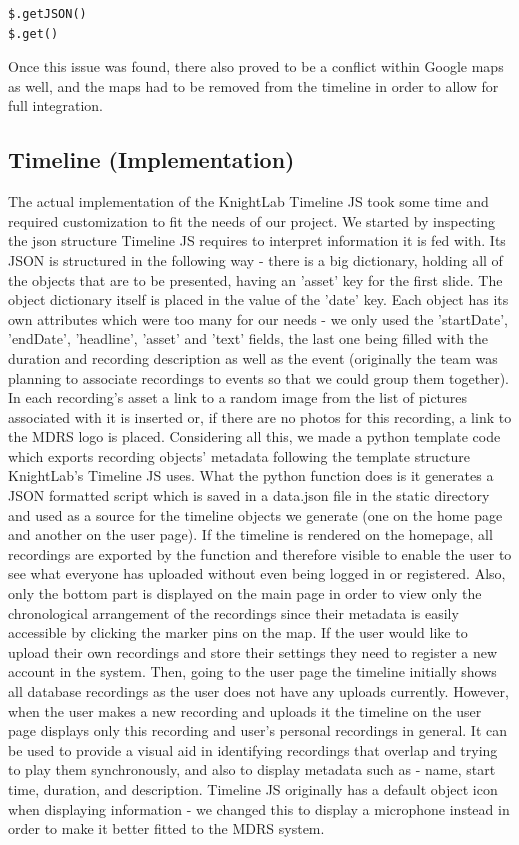 \documentclass{l3proj}
\begin{document}
\begin{verbatim}
$.getJSON()
$.get()
\end{verbatim}

Once this issue was found, there also proved to be a conflict within Google maps as well, and the maps had to be removed from the timeline in order to allow for full integration.

\subsection{Timeline (Implementation)}

The actual implementation of the KnightLab Timeline JS took some time and required customization to fit the needs of our project. We started by inspecting the json structure Timeline JS requires to interpret information it is fed with.
Its JSON is structured in the following way - there is a big dictionary, holding all of the objects that are to be presented, having an 'asset' key for the first slide.
The object dictionary itself is placed in the value of the 'date' key. Each object has its own attributes which were too many for our needs - we only used the 'startDate', 'endDate', 'headline', 'asset' and 'text' fields, the last one being filled with the duration and recording description as well as the event (originally the team was planning to associate recordings to events so that we could group them together).
In each recording's asset a link to a random image from the list of pictures associated with it is inserted or, if there are no photos for this recording, a link to the MDRS logo is placed.
Considering all this, we made a python template code which exports recording objects' metadata following the template structure KnightLab's Timeline JS uses.
What the python function does is it generates a JSON formatted script which is saved in a data.json file in the static directory and used as a source for the timeline objects we generate (one on the home page and another on the user page).
If the timeline is rendered on the homepage, all recordings are exported by the function and therefore visible to enable the user to see what everyone has uploaded without even being logged in or registered.
Also, only the bottom part is displayed on the main page in order to view only the chronological arrangement of the recordings since their metadata is easily accessible by clicking the marker pins on the map.
If the user would like to upload their own recordings and store their settings they need to register a new account in the system.
Then, going to the user page the timeline initially shows all database recordings as the user does not have any uploads currently.
However, when the user makes a new recording and uploads it the timeline on the user page displays only this recording and user's personal recordings in general.
It can be used to provide a visual aid in identifying recordings that overlap and trying to play them synchronously, and also to display metadata such as - name, start time, duration, and description.
Timeline JS originally has a default object icon when displaying information - we changed this to display a microphone instead in order to make it better fitted to the MDRS system.
\end{document}

